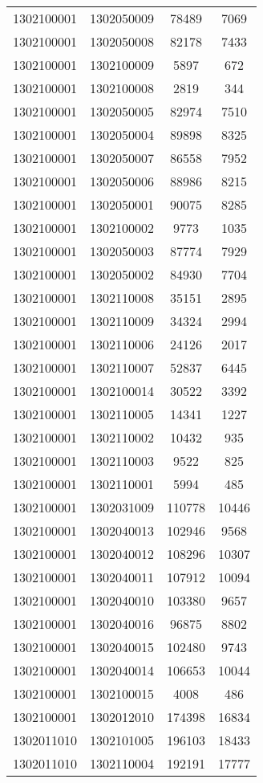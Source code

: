 \begin{longtable}{llcc}
1302100001 & 1302050009 & 78489 & 7069\\
1302100001 & 1302050008 & 82178 & 7433\\
1302100001 & 1302100009 & 5897 & 672\\
1302100001 & 1302100008 & 2819 & 344\\
1302100001 & 1302050005 & 82974 & 7510\\
1302100001 & 1302050004 & 89898 & 8325\\
1302100001 & 1302050007 & 86558 & 7952\\
1302100001 & 1302050006 & 88986 & 8215\\
1302100001 & 1302050001 & 90075 & 8285\\
1302100001 & 1302100002 & 9773 & 1035\\
1302100001 & 1302050003 & 87774 & 7929\\
1302100001 & 1302050002 & 84930 & 7704\\
1302100001 & 1302110008 & 35151 & 2895\\
1302100001 & 1302110009 & 34324 & 2994\\
1302100001 & 1302110006 & 24126 & 2017\\
1302100001 & 1302110007 & 52837 & 6445\\
1302100001 & 1302100014 & 30522 & 3392\\
1302100001 & 1302110005 & 14341 & 1227\\
1302100001 & 1302110002 & 10432 & 935\\
1302100001 & 1302110003 & 9522 & 825\\
1302100001 & 1302110001 & 5994 & 485\\
1302100001 & 1302031009 & 110778 & 10446\\
1302100001 & 1302040013 & 102946 & 9568\\
1302100001 & 1302040012 & 108296 & 10307\\
1302100001 & 1302040011 & 107912 & 10094\\
1302100001 & 1302040010 & 103380 & 9657\\
1302100001 & 1302040016 & 96875 & 8802\\
1302100001 & 1302040015 & 102480 & 9743\\
1302100001 & 1302040014 & 106653 & 10044\\
1302100001 & 1302100015 & 4008 & 486\\
1302100001 & 1302012010 & 174398 & 16834\\
1302011010 & 1302101005 & 196103 & 18433\\
1302011010 & 1302110004 & 192191 & 17777\\

\end{longtable}
